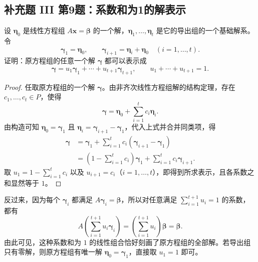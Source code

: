 \documentclass[UTF8, fontset=fandol, a4paper, 12pt]{ctexart}
\newcommand{\vx}{\boldsymbol{x}}
\newcommand{\vb}{\boldsymbol{\beta}}
\newcommand{\veta}{\boldsymbol{\eta}}
\theoremstyle{definition}
\begin{document}
\subsection{补充题 III 第9题：系数和为1的解表示}

设 $\veta_0$ 是线性方程组 $A\vx=\vb$ 的一个解，$\veta_1,\ldots,\veta_t$ 是它的导出组的一个基础解系。令
\[
 \boldsymbol\gamma_1=\veta_0,\qquad
 \boldsymbol\gamma_{i+1}=\veta_i+\veta_0\quad(i=1,\ldots,t).
\]
证明：原方程组的任意一个解 $\boldsymbol\gamma$ 都可以表示成
\[
 \boldsymbol\gamma=u_1\boldsymbol\gamma_1+\cdots+u_{t+1}\boldsymbol\gamma_{t+1},
 \qquad u_1+\cdots+u_{t+1}=1.
\]
\begin{proof}
任取原方程组的一个解 $\boldsymbol\gamma$。由非齐次线性方程组解的结构定理，存在 $c_1,\ldots,c_t\in P$，使得
\[
 \boldsymbol\gamma=\veta_0+\sum_{i=1}^{t}c_i\veta_i.
\]
由构造可知 $\veta_0=\boldsymbol\gamma_1$ 且 $\veta_i=\boldsymbol\gamma_{i+1}-\boldsymbol\gamma_1$，代入上式并合并同类项，得
\begin{align*}
 \boldsymbol\gamma
 &=\boldsymbol\gamma_1+
 \sum_{i=1}^{t}c_i(\boldsymbol\gamma_{i+1}-\boldsymbol\gamma_1)\\
 &=\left(1-\sum_{i=1}^{t}c_i\right)\boldsymbol\gamma_1
 +\sum_{i=1}^{t}c_i\boldsymbol\gamma_{i+1}.
\end{align*}
取 $u_1=1-\sum_{i=1}^{t}c_i$ 以及 $u_{i+1}=c_i$（$i=1,\ldots,t$），即得到所求表示，且各系数之和显然等于 $1$。
\end{proof}

反过来，因为每个 $\boldsymbol\gamma_i$ 都满足 $A\boldsymbol\gamma_i=\vb$，所以对任意满足 $\sum_{i=1}^{t+1}u_i=1$ 的系数，都有
\[
 A\left(\sum_{i=1}^{t+1}u_i\boldsymbol\gamma_i\right)
 =\left(\sum_{i=1}^{t+1}u_i\right)\vb=\vb.
\]
由此可见，这种系数和为 $1$ 的线性组合恰好刻画了原方程组的全部解。若导出组只有零解，则原方程组有唯一解 $\veta_0=\boldsymbol\gamma_1$，直接取 $u_1=1$ 即可。
\end{document}
